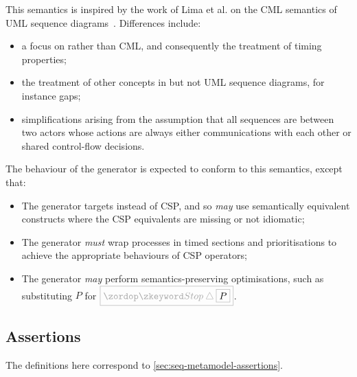 
This semantics is inspired by the work of Lima et al. on the CML semantics of
UML sequence diagrams~\cite{lima-semantics}.  Differences include:

\begin{itemize}
\item a focus on \tockcsp{} rather than CML, and consequently the
  treatment of timing properties;
\item
  the treatment of other concepts in \langname{} but not UML sequence
  diagrams, for instance gaps;
\item simplifications arising from the assumption that all sequences
  are between two actors whose actions are always either communications with
  each other or shared control-flow decisions.
\end{itemize}

The behaviour of the \langname{} generator is expected to conform to
this semantics, except that:

\begin{itemize}
\item
  The generator targets \cspm{} instead of CSP, and so \emph{may}
  use semantically equivalent \cspm{} constructs where the CSP equivalents
  are missing or not idiomatic;
\item
  The generator \emph{must} wrap processes in
  timed sections and prioritisations to achieve the appropriate \tockcsp{} behaviours of
  CSP operators;
\item
  The generator \emph{may} perform semantics-preserving optimisations,
  such as substituting \(P\) for \(\tlang{\Stop \interrupt \olang{P}}\).
\end{itemize}


\subsection{Assertions}

The definitions here correspond to \cref{sec:seq-metamodel-assertions}.

